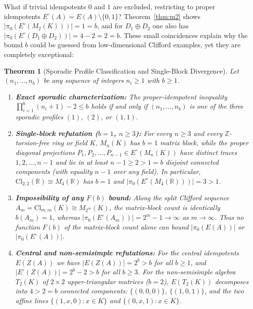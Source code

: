 \documentclass[11pt,a4paper]{article}
\newtheorem{theorem}{Theorem}[section]
\theoremstyle{definition}
\newcommand{\R}{\mathbb{R}}
\newcommand{\Z}{\mathbb{Z}}
\newcommand{\Cl}{\mathrm{Cl}}
\begin{document}
What if trivial idempotents $0$ and $1$ are excluded, restricting to proper idempotents
$E^\circ(A)=E(A)\setminus\{0,1\}$? Theorem~\ref{thm:m2} shows $|\pi_0(E^\circ(M_2(K)))|=1=b$,
and for $D_1\oplus D_2$ one also has $|\pi_0(E^\circ(D_1\oplus D_2))|=4-2=2=b$. These small
coincidences explain why the bound $b$ could be guessed from low-dimensional Clifford
examples, yet they are completely exceptional:

\begin{theorem}[Sporadic Profile Classification and Single-Block Divergence]\label{thm:sporadic}
Let $(n_1,\dots,n_b)$ be any sequence of integers $n_i\ge 1$ with $b\ge 1$.
\begin{enumerate}
  \setlength{\itemsep}{2pt}
  \item \textbf{Exact sporadic characterization:} The proper-idempotent inequality
    $\prod_{i=1}^b(n_i+1) - 2 \le b$ holds \emph{if and only if} $(n_1,\dots,n_b)$ is one of
    the three sporadic profiles $(1)$, $(2)$, or $(1,1)$.
  \item \textbf{Single-block refutation ($b=1$, $n\ge 3$):} For every $n\ge 3$ and every
    $\Z$-torsion-free ring or field $K$, $M_n(K)$ has $b=1$ matrix block, while the proper
    diagonal projections $P_1,P_2,\dots,P_{n-1}\in E^\circ(M_n(K))$ have distinct traces
    $1,2,\dots,n-1$ and lie in at least $n-1\ge 2 > 1 = b$ disjoint connected components
    (with equality $n-1$ over any field). In particular, $\Cl_{2,2}(\R)\cong M_4(\R)$ has
    $b=1$ and $|\pi_0(E^\circ(M_4(\R)))| = 3 > 1$.
  \item \textbf{Impossibility of any $F(b)$ bound:} Along the split Clifford sequence
    $A_m = \Cl_{m,m}(K)\cong M_{2^m}(K)$, the matrix-block count is identically $b(A_m)=1$,
    whereas $|\pi_0(E^\circ(A_m))| = 2^m - 1 \to \infty$ as $m\to\infty$. Thus \emph{no}
    function $F(b)$ of the matrix-block count alone can bound $|\pi_0(E(A))|$ or
    $|\pi_0(E^\circ(A))|$.
  \item \textbf{Central and non-semisimple refutations:} For the central idempotents
    $E(Z(A))$ we have $|E(Z(A))| = 2^b > b$ for all $b\ge 1$, and $|E^\circ(Z(A))| = 2^b - 2 > b$
    for all $b\ge 3$. For the non-semisimple algebra $T_2(K)$ of $2\times 2$ upper-triangular
    matrices ($b=2$), $E(T_2(K))$ decomposes into $4 > 2 = b$ connected components:
    $\{(0,0,0)\}$, $\{(1,0,1)\}$, and the two affine lines $\{(1,x,0):x\in K\}$ and
    $\{(0,x,1):x\in K\}$.
\end{enumerate}
\end{theorem}
\end{document}
